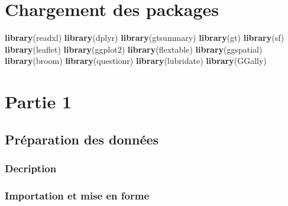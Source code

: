 \documentclass[
]{article}
\author{}
\date{\vspace{-2.5em}}
\newenvironment{Shaded}{\begin{snugshade}}{\end{snugshade}}
\newcommand{\FunctionTok}[1]{\textcolor[rgb]{0.13,0.29,0.53}{\textbf{#1}}}
\newcommand{\NormalTok}[1]{#1}
\begin{document}


\newpage


\renewcommand{\contentsname}{\textcolor{blue}{Table des matières}}

\textcolor{blue}{\tableofcontents}

\newpage

\hypertarget{chargement-des-packages}{%
\section{Chargement des packages}\label{chargement-des-packages}}

\begin{Shaded}
\begin{Highlighting}[]
\FunctionTok{library}\NormalTok{(readxl)}
\FunctionTok{library}\NormalTok{(dplyr)}
\FunctionTok{library}\NormalTok{(gtsummary)}
\FunctionTok{library}\NormalTok{(gt)}
\FunctionTok{library}\NormalTok{(sf)}
\FunctionTok{library}\NormalTok{(leaflet)}
\FunctionTok{library}\NormalTok{(ggplot2)}
\FunctionTok{library}\NormalTok{(flextable)}
\FunctionTok{library}\NormalTok{(ggspatial)}
\FunctionTok{library}\NormalTok{(broom)}
\FunctionTok{library}\NormalTok{(questionr)}
\FunctionTok{library}\NormalTok{(lubridate)}
\FunctionTok{library}\NormalTok{(GGally)}
\end{Highlighting}
\end{Shaded}

\hypertarget{partie-1}{%
\section{Partie 1}\label{partie-1}}

\hypertarget{pruxe9paration-des-donnuxe9es}{%
\subsection{Préparation des
données}\label{pruxe9paration-des-donnuxe9es}}

\hypertarget{decription}{%
\subsubsection{Decription}\label{decription}}

\hypertarget{importation-et-mise-en-forme}{%
\subsubsection{Importation et mise en
forme}\label{importation-et-mise-en-forme}}
\end{document}

